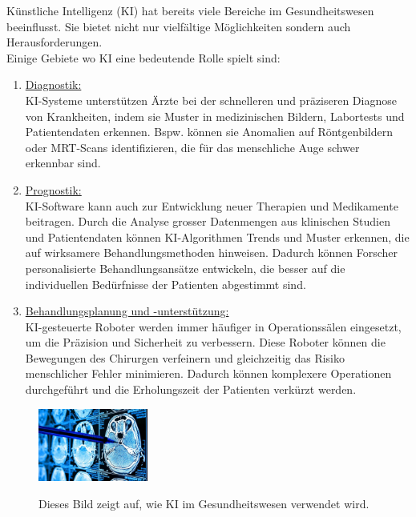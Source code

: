 \documentclass{report}
\begin{document}
Künstliche Intelligenz (KI) hat bereits viele Bereiche im Gesundheitswesen beeinflusst. Sie bietet nicht nur 
vielfältige Möglichkeiten sondern auch Herausforderungen.\\ Einige Gebiete wo KI eine bedeutende Rolle spielt sind:


\begin{enumerate}
    \item \underline{Diagnostik:} \\KI-Systeme unterstützen Ärzte bei der schnelleren und präziseren Diagnose 
    von Krankheiten, indem sie Muster in medizinischen Bildern, Labortests und Patientendaten erkennen.
    Bspw. können sie Anomalien auf Röntgenbildern oder MRT-Scans identifizieren, die für das menschliche 
    Auge schwer erkennbar sind.
    \item \underline{Prognostik:} \\KI-Software kann auch zur Entwicklung neuer Therapien und Medikamente beitragen. 
    Durch die Analyse grosser Datenmengen aus klinischen Studien und Patientendaten können KI-Algorithmen 
    Trends und Muster erkennen, die auf wirksamere Behandlungsmethoden hinweisen. Dadurch können Forscher 
    personalisierte Behandlungsansätze entwickeln, die besser auf die individuellen Bedürfnisse der 
    Patienten abgestimmt sind. 
    \item \underline{Behandlungsplanung und -unterstützung:} \\KI-gesteuerte Roboter werden immer häufiger in
    Operationssälen eingesetzt, um die Präzision und Sicherheit zu verbessern. Diese Roboter können
    die Bewegungen des Chirurgen verfeinern und gleichzeitig das Risiko menschlicher Fehler minimieren. 
    Dadurch können komplexere Operationen durchgeführt und die Erholungszeit der Patienten verkürzt werden. \citep{mauriceneumann.de}
\end{enumerate} 

\begin{figure}[H]
    \centering
    \includegraphics[width=0.32\textwidth]{fotitooppa.jpg}
    \label{fig:fotitooppa}
    \caption{Dieses Bild zeigt auf, wie KI im Gesundheitswesen verwendet wird.}
\end{figure}
\end{document}
